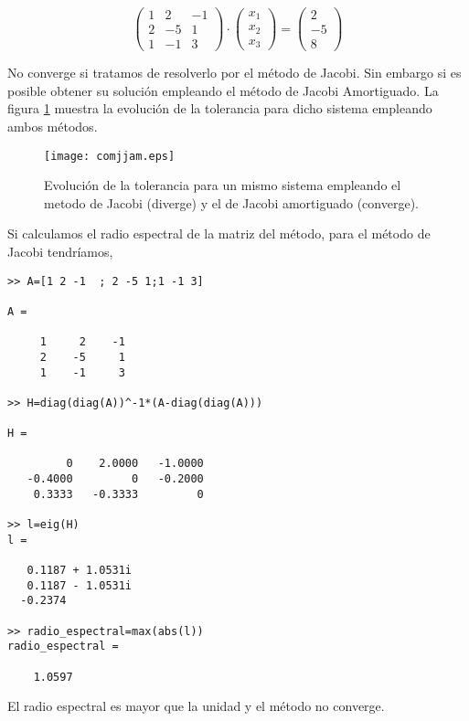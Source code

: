 \begin{equation*}
\begin{pmatrix}
1& 2& -1\\
2& -5& 1\\
1& -1& 3
\end{pmatrix}\cdot \begin{pmatrix}
x_1\\
x_2\\
x_3
\end{pmatrix}=\begin{pmatrix}
2\\
-5\\
8
\end{pmatrix}
\end{equation*}

No converge si tratamos de resolverlo por el método de Jacobi. Sin embargo si es posible obtener su solución empleando el método de Jacobi Amortiguado. La figura \ref{fig:cjjam}  muestra la evolución de la tolerancia para dicho sistema empleando ambos métodos.

\begin{figure}[h]
\centering
\texttt{[image: comjjam.eps]}
\caption{Evolución de la tolerancia para un mismo sistema empleando el metodo de Jacobi (diverge) y el de Jacobi amortiguado (converge).}
\label{fig:cjjam}


\end{figure}

Si calculamos el radio espectral de la matriz del método, para el método de Jacobi tendríamos,
\begin{verbatim}
>> A=[1 2 -1  ; 2 -5 1;1 -1 3]

A =

     1     2    -1
     2    -5     1
     1    -1     3

>> H=diag(diag(A))^-1*(A-diag(diag(A)))

H =

         0    2.0000   -1.0000
   -0.4000         0   -0.2000
    0.3333   -0.3333         0

>> l=eig(H)
l =

   0.1187 + 1.0531i
   0.1187 - 1.0531i
  -0.2374          

>> radio_espectral=max(abs(l))
radio_espectral =

    1.0597
\end{verbatim}

El radio espectral es mayor que la unidad y el método no converge.

